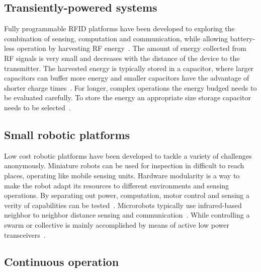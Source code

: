 \documentclass[letterpaper, 10 pt, conference]{ieeeconf}  %
\begin{document}
\subsection{Transiently-powered systems}

Fully programmable RFID platforms have been developed to exploring the combination of sensing, computation and communication, while allowing battery-less operation by harvesting RF energy~\cite{sample_transim_2008}.
The amount of energy collected from RF signals is very small and decreases with the distance of the device to the transmitter.
The harvested energy is typically stored in a capacitor, where larger capacitors can buffer more energy and smaller capacitors have the advantage of shorter charge times~\cite{gummerson_mobisys_2010}.
For longer, complex operations the energy budged needs to be evaluated carefully.
To store the energy an appropriate size storage capacitor needs to be selected~\cite{naderiparizi_rfid_2015}.



\subsection{Small robotic platforms}

Low cost robotic platforms have been developed to tackle a variety of challenges anonymously.
Miniature robots can be used for inspection in difficult to reach places, operating like mobile sensing units.
Hardware modularity is a way to make the robot adapt its resources to different environments and sensing operations.
By separating out power, computation, motor control and sensing a verity of capabilities can be tested~\cite{sabelhaus_icra_2013, pickem_icra_2015, kim_iros_2016}.
Microrobots typically use infrared-based neighbor to neighbor distance sensing and communication~\cite{rubenstein_icra_2012, pickem_icra_2015, kim_iros_2016}.
While controlling a swarm or collective is mainly accomplished by means of active low power transceivers~\cite{sabelhaus_icra_2013, pickem_icra_2015, kim_iros_2016}. 

\subsection{Continuous operation} 
\end{document}
